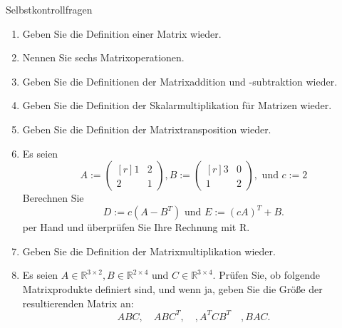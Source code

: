 \documentclass[
  8pt,
  ignorenonframetext,
]{beamer}
\begin{document}
\begin{frame}{Selbstkontrollfragen}
\protect\hypertarget{selbstkontrollfragen}{}
\footnotesize
\begin{enumerate}
\item Geben Sie die Definition einer Matrix wieder.
\item Nennen Sie sechs Matrixoperationen.
\item Geben Sie die Definitionen der Matrixaddition und -subtraktion wieder.
\item Geben Sie die Definition der Skalarmultiplikation für Matrizen wieder.
\item Geben Sie die Definition der Matrixtransposition wieder.
\item Es seien
\begin{equation}
A :=
\begin{pmatrix*}[r]
1 & 2 \\
2 & 1
\end{pmatrix*},
B :=
\begin{pmatrix*}[r]
3 & 0 \\
1 & 2
\end{pmatrix*},
\mbox{ und }
c := 2
\end{equation}
Berechnen Sie
\begin{equation}
D := c\left(A - B^T\right)
\mbox{ und }
E := \left(cA\right)^T + B.
\end{equation}
per Hand und überprüfen Sie Ihre Rechnung mit R.


\item Geben Sie die Definition der Matrixmultiplikation wieder.
\item Es seien $A \in \mathbb{R}^{3 \times 2}, B \in \mathbb{R}^{2\times 4}$
und $C \in \mathbb{R}^{3 \times 4}$. Prüfen Sie, ob folgende Matrixprodukte
definiert sind, und wenn ja, geben Sie die Größe der resultierenden Matrix an:
\begin{equation}
ABC, \quad ABC^T, \quad, A^TCB^T \quad, BAC.
\end{equation}

\end{enumerate}
\end{frame}
\end{document}
